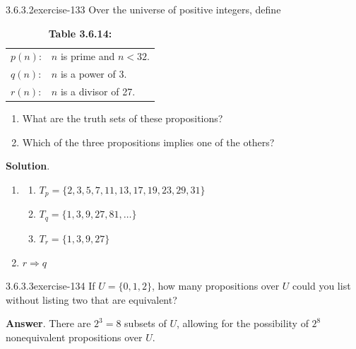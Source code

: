 \documentclass[twoside,10pt,]{book}
\numberwithin{equation}{section}
\begin{document}
\begin{divisionsolution}{3.6.3.2}{}{exercise-133}%
\hypertarget{p-1276}{}%
Over the universe of positive integers, define%
\begin{table}
\centering
\begin{tabular}{ll}
\(p(n)\):&\(n\) is prime and \(n < 32\).\tabularnewline[0pt]
\(q(n)\):&\(n\) is a power of 3.\tabularnewline[0pt]
\(r(n)\):&\(n\) is a divisor of 27.
\end{tabular}
\caption*{\textbf{Table 3.6.14:} }
\end{table}
\hypertarget{p-1277}{}%
\leavevmode%
\begin{enumerate}[label=(\alph*)]
\item\hypertarget{li-726}{}\hypertarget{p-1278}{}%
What are the truth sets of these propositions?%
\item\hypertarget{li-727}{}\hypertarget{p-1279}{}%
Which of the three propositions implies one of the others?%
\end{enumerate}
%
\par\smallskip%
\noindent\textbf{Solution}.\quad%
\hypertarget{p-1280}{}%
\leavevmode%
\begin{enumerate}[label=(\alph*)]
\item\hypertarget{li-728}{}\hypertarget{p-1281}{}%
%
\begin{enumerate}[label=(\roman*)]
\item\hypertarget{li-729}{}\hypertarget{p-1282}{}%
\(T_p = \{2, 3, 5, 7, 11, 13, 17, 19, 23, 29, 31 \}\)%
\item\hypertarget{li-730}{}\hypertarget{p-1283}{}%
\(T_q = \{1, 3, 9, 27, 81, \dots \}\)%
\item\hypertarget{li-731}{}\hypertarget{p-1284}{}%
\(T_r = \{1, 3, 9, 27 \}\)%
\end{enumerate}
%
\item\hypertarget{li-732}{}\hypertarget{p-1285}{}%
\(r \Rightarrow q \)%
\end{enumerate}
%
\end{divisionsolution}%
\begin{divisionsolution}{3.6.3.3}{}{exercise-134}%
\hypertarget{p-1286}{}%
If \(U = \{0, 1, 2\}\), how many propositions over \(U\) could you list without listing two that are equivalent?%
\par\smallskip%
\noindent\textbf{Answer}.\quad%
\hypertarget{p-1287}{}%
There are \(2^3=8\) subsets of \(U\), allowing for the possibility of \(2^8\) nonequivalent propositions over \(U\).%
\end{divisionsolution}%
\end{document}
